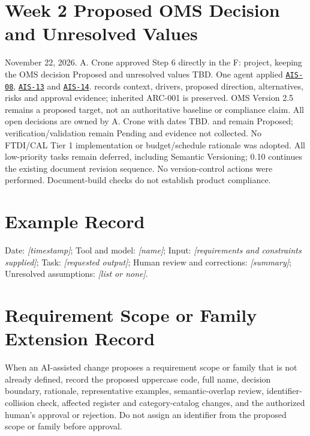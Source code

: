 \section{Week 2 Proposed OMS Decision and Unresolved Values}
November 22, 2026. A. Crone approved Step 6 directly in the F: project,
keeping the OMS decision Proposed and unresolved values TBD.
One agent applied \hyperref[Skill:AIS-08]{\texttt{AIS-08}},
\hyperref[Skill:AIS-13]{\texttt{AIS-13}} and \hyperref[Skill:AIS-14]{\texttt{AIS-14}}.
 records context, drivers, proposed direction,
alternatives, risks and approval evidence; inherited ARC-001 is preserved.
OMS Version 2.5 remains a proposed target, not an authoritative baseline or
compliance claim. All open decisions are owned by A. Crone with dates TBD.
 and  remain Proposed;
verification/validation remain Pending and evidence not collected.
No FTDI/CAL Tier 1 implementation or budget/schedule rationale was adopted.
All low-priority tasks remain deferred, including Semantic Versioning;
0.10 continues the existing document revision sequence. No version-control
actions were performed. Document-build checks do not establish product compliance.

\section{Example Record}
Date: \textit{[timestamp]}; Tool and model: \textit{[name]}; Input: \textit{[requirements and constraints supplied]}; Task: \textit{[requested output]}; Human review and corrections: \textit{[summary]}; Unresolved assumptions: \textit{[list or none]}.

\section{Requirement Scope or Family Extension Record}
When an AI-assisted change proposes a requirement scope or family that is not
already defined, record the proposed uppercase code, full name, decision
boundary, rationale, representative examples, semantic-overlap review,
identifier-collision check, affected register and category-catalog changes, and
the authorized human's approval or rejection. Do not assign an identifier from
the proposed scope or family before approval.
